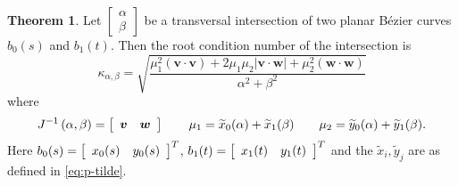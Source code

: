 \documentclass[3p, authoryear, square]{elsarticle}
\theoremstyle{definition}
\newtheorem{theorem}{Theorem}[section]
\begin{document}
\begin{theorem}\label{thm:kappa-closed-form}
Let \(\left[\begin{array}{c} \alpha \\ \beta \end{array}\right]\) be a
transversal intersection of two planar B\'{e}zier curves \(b_0(s)\) and
\(b_1(t)\). Then the root condition number of the intersection is
\begin{equation}\label{eq:kappa-max}
\kappa_{\alpha, \beta} = \sqrt{\frac{\mu_1^2
  \left(\bm{v} \cdot \bm{v}\right) +
  2 \mu_1 \mu_2 \left|\bm{v} \cdot \bm{w}\right| +
  \mu_2^2 \left(\bm{w} \cdot \bm{w}\right)}{\alpha^2 + \beta^2}}
\end{equation}
where
\begin{equation}
  J^{-1}\left(\alpha, \beta\right) = \left[ \begin{array}{c c}
  \bm{v} & \bm{w} \end{array}\right] \qquad
  \mu_1 = \widetilde{x}_0(\alpha) + \widetilde{x}_1(\beta) \qquad
  \mu_2 = \widetilde{y}_0(\alpha) + \widetilde{y}_1(\beta).
\end{equation}
Here \(b_0(s) = \left[\begin{array}{c c} x_0(s) & y_0(s)\end{array}\right]^T\),
\(b_1(t) = \left[\begin{array}{c c} x_1(t) & y_1(t)\end{array}\right]^T\)
and the \(\widetilde{x}_i, \widetilde{y}_j\) are as defined in
\eqref{eq:p-tilde}.
\end{theorem}
\end{document}
